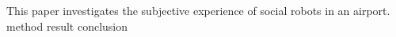 \label{Abstract}
This paper investigates the subjective experience of social robots in an airport.
method
result
conclusion
